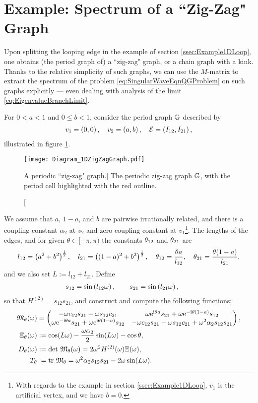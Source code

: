 \section{Example: Spectrum of a ``Zig-Zag" Graph} \label{sec:Scalar-General1DChain}
Upon splitting the looping edge in the example of section \ref{ssec:Example1DLoop}, one obtains (the period graph of) a ``zig-zag" graph, or a chain graph with a kink.
Thanks to the relative simplicity of such graphs, we can use the $M$-matrix to extract the spectrum of the problem \eqref{eq:SingularWaveEqnQGProblem} on such graphs explicitly --- even dealing with analysis of the limit \eqref{eq:EigenvalueBranchLimit}.

For $0<a<1$ and $0\leq b<1$, consider the period graph $\mathbb{G}$ described by
\begin{align*}
	v_1=\left( 0,0 \right), \quad
	v_2=\left( a,b \right), \quad
	\mathcal{E} = \left( I_{12},I_{21} \right),
\end{align*}
illustrated in figure \ref{fig:Diagram_1DZigZagGraph}.
\begin{figure}[b!]
	\centering
	\texttt{[image: Diagram\_1DZigZagGraph.pdf]}
	\caption[A periodic ``zig-zag" graph.]{\label{fig:Diagram_1DZigZagGraph} The periodic zig-zag graph $\mathbb{G}$, with the period cell highlighted with the red outline.}
\end{figure}
We assume that $a$, $1-a$, and $b$ are pairwise irrationally related, and there is a coupling constant $\alpha_2$ at $v_2$ and zero coupling constant at $v_1$\footnote{With regards to the example in section \ref{ssec:Example1DLoop}, $v_1$ is the artificial vertex, and we have $b=0$.}.
The lengths of the edges, and for given $\theta\in[-\pi,\pi)$ the constants $\theta_{12}$ and $\theta_{21}$ are
\begin{align*}
	l_{12} = \left( a^2+b^2 \right)^{\frac{1}{2}}, \quad
	l_{21} = \left( (1-a)^2+b^2 \right)^{\frac{1}{2}}, \quad
	\theta_{12} = \frac{\theta a}{l_{12}}, \quad
	\theta_{21} = \frac{\theta (1-a)}{l_{21}},
\end{align*}
and we also set $L:=l_{12}+l_{21}$.
Define
\begin{align*}
	s_{12} = \sin\left( l_{12}\omega \right), \qquad
	s_{21} = \sin\left( l_{21}\omega \right), \qquad
\end{align*}
so that $H^{(2)}=s_{12}s_{21}$, and construct and compute the following functions;
\begin{align*}
	\mathfrak{M}_{\theta}(\omega) &=
	\begin{pmatrix}
		-\omega c_{12}s_{21} - \omega s_{12}c_{21} & 
		\omega \mathrm{e}^{\mathrm{i}\theta a}s_{21} + \omega \mathrm{e}^{-\mathrm{i}\theta(1-a)}s_{12} \\
		\omega \mathrm{e}^{-\mathrm{i}\theta a}s_{21} + \omega \mathrm{e}^{\mathrm{i}\theta(1-a)}s_{12} &
		-\omega c_{12}s_{21} - \omega s_{12}c_{21} + \omega^2\alpha_2 s_{12}s_{21}
	\end{pmatrix}, \\
	\Xi_{\theta}(\omega) &:= \cos(L\omega) - \frac{\omega\alpha_2}{2}\sin(L\omega) - \cos\theta, \\
	D_{\theta}(\omega) &:= \mathrm{det} \ \mathfrak{M}_{\theta}(\omega) = 2 \omega^2 H^{(2)}(\omega)\Xi(\omega), \\
	T_{\theta} &:= \mathrm{tr} \ \mathfrak{M}_{\theta} = \omega^2\alpha_2 s_{12}s_{21} - 2\omega\sin(L\omega).
\end{align*}
